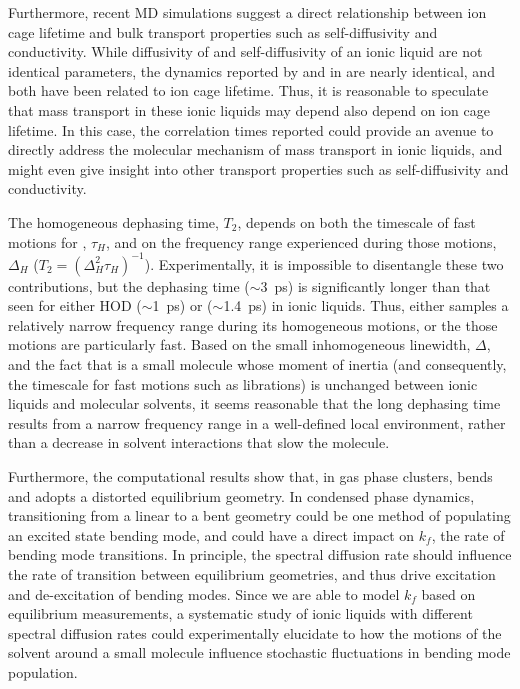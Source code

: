 Furthermore, recent MD simulations suggest a direct relationship between ion cage lifetime and bulk transport properties such as self-diffusivity and conductivity.\cite{Zhang2015b} While diffusivity of  and self-diffusivity of an ionic liquid are not identical parameters, the dynamics reported by  and \ce{[SCN]-}\cite{Ren2014} in \ce{[Im_{4,1}][Tf2N]} are nearly identical, and both have been related to ion cage lifetime. Thus, it is reasonable to speculate that  mass transport in these ionic liquids may depend also depend on ion cage lifetime. In this case, the correlation times reported could provide an avenue to directly address the molecular mechanism of  mass transport in ionic liquids, and might even give insight into other transport properties such as self-diffusivity and conductivity.

The homogeneous dephasing time, $T_2$, depends on both the timescale of fast motions for , $\tau_H$, and on the frequency range experienced during those motions, $\Delta_H$ ($T_{2} = \left( {\Delta}_H^{2}\tau_H \right)^{-1}$). Experimentally, it is impossible to disentangle these two contributions, but the dephasing time ($\sim 3$~ps) is significantly longer than that seen for either HOD ($\sim$\SI{1}{\ps}) or  ($\sim$\SI{1.4}{\ps}) in ionic liquids. Thus, either  samples a relatively narrow frequency range during its homogeneous motions, or the those motions are particularly fast. Based on the small inhomogeneous linewidth, $\Delta$, and the fact that  is a small molecule whose moment of inertia (and consequently, the timescale for fast motions such as librations) is unchanged between ionic liquids and molecular solvents, it seems reasonable that the long dephasing time results from a narrow frequency range in a well-defined local environment, rather than a decrease in solvent interactions that slow the molecule.

Furthermore, the computational results show that, in gas phase clusters,  bends and adopts a distorted equilibrium geometry. In condensed phase dynamics, transitioning from a linear to a bent geometry could be one method of populating an excited state bending mode, and could have a direct impact on $k_f$, the rate of bending mode transitions. In principle, the spectral diffusion rate should influence the rate of transition between equilibrium geometries, and thus drive excitation and de-excitation of bending modes. Since we are able to model $k_f$ based on equilibrium measurements, a systematic study of ionic liquids with different spectral diffusion rates could experimentally elucidate to how the motions of the solvent around a small molecule influence stochastic fluctuations in bending mode population.

